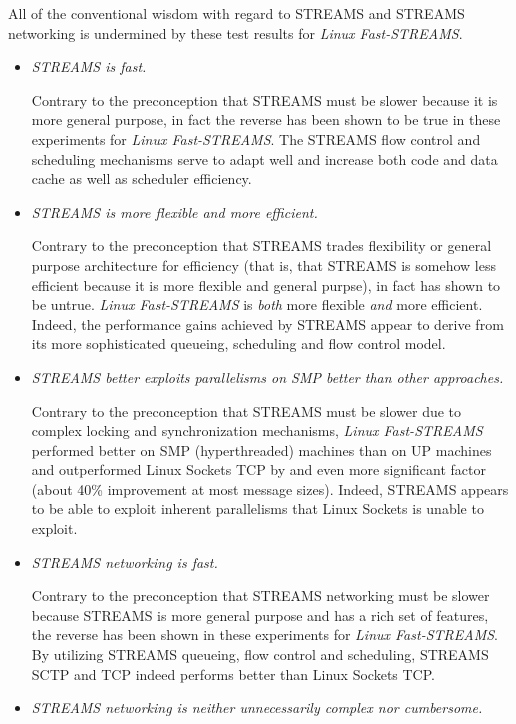 \documentclass[letterpaper,final,notitlepage,twocolumn,10pt,twoside]{article}
\begin{document}
All of the conventional wisdom with regard to STREAMS and STREAMS networking is undermined by these
test results for \textsl{Linux Fast-STREAMS}.

\begin{itemize}

\item \textit{STREAMS is fast.}

Contrary to the preconception that STREAMS must be slower because it is more general purpose, in
fact the reverse has been shown to be true in these experiments for \textsl{Linux Fast-STREAMS}.
The STREAMS flow control and scheduling mechanisms serve to adapt well and increase both code and
data cache as well as scheduler efficiency.

\item \textit{STREAMS is more flexible {\em and} more efficient.}

Contrary to the preconception that STREAMS trades flexibility or general purpose architecture for
efficiency (that is, that STREAMS is somehow less efficient because it is more flexible and general
purpse), in fact has shown to be untrue.  \textsl{Linux Fast-STREAMS} is {\em both} more flexible
{\em and} more efficient.  Indeed, the performance gains achieved by  STREAMS appear to derive from
its more sophisticated queueing, scheduling and flow control model.

\item \textit{STREAMS better exploits parallelisms on SMP better than other approaches.}

Contrary to the preconception that STREAMS must be slower due to complex locking and synchronization
mechanisms, \textsl{Linux Fast-STREAMS} performed better on SMP (hyperthreaded) machines than on UP
machines and outperformed Linux Sockets TCP by and even more significant factor (about 40\%
improvement at most message sizes).  Indeed, STREAMS appears to be able to exploit inherent
parallelisms that Linux Sockets is unable to exploit.

\item \textit{STREAMS networking is fast.}

Contrary to the preconception that STREAMS networking must be slower because STREAMS is more general
purpose and has a rich set of features, the reverse has been shown in these experiments for
\textsl{Linux Fast-STREAMS}.  By utilizing STREAMS queueing, flow control and scheduling, STREAMS
SCTP and TCP indeed performs better than Linux Sockets TCP.

\item \textit{STREAMS networking is neither unnecessarily complex nor cumbersome.}


\end{itemize}
\end{document}
